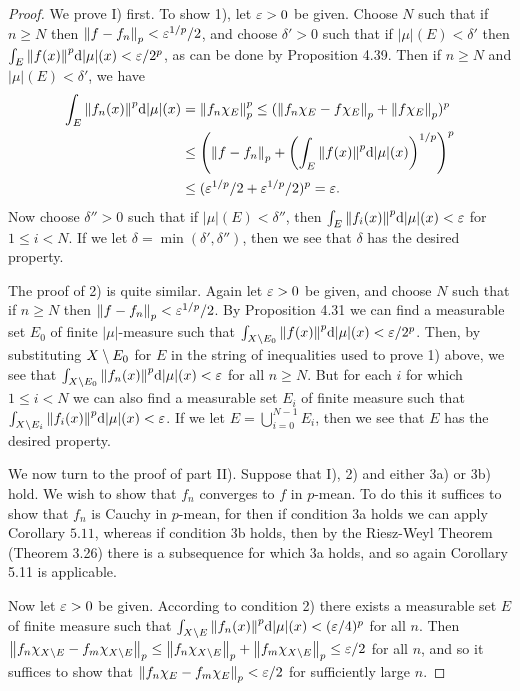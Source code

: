 \begin{proof}
We prove I) first. To show 1), let $\varepsilon>0$ be given. Choose $N$ such that if $n\geq N$ then $\norm{f-f_n}_p<\varepsilon^{1/p}/2$, and choose $\delta'>0$ such that if $|\mu|(E)<\delta'$ then $\int_E\norm{f(x)}^p\dd|\mu|(x)<\varepsilon/2^p$, as can be done by Proposition 4.39. Then if $n\geq N$ and $|\mu|(E)<\delta'$, we have 
\begin{align*}
\int_E\norm{f_n(x)}^p\dd|\mu|(x)&=\norm{f_n\chi_{E}}_p^p\leq(\norm{f_n\chi_{E}-f\chi_{E}}_p+\norm{f\chi_{E}}_p)^p\\
&\leq\left(\norm{f-f_n}_p+\left(\int_E\norm{f(x)}^p\dd|\mu|(x)\right)^{1/p}\right)^p\\
&\leq(\varepsilon^{1/p}/2+\varepsilon^{1/p}/2)^p=\varepsilon.
\end{align*}
Now choose $\delta''>0$ such that if $|\mu|(E)<\delta''$, then $\int_E\norm{f_i(x)}^p\dd|\mu|(x)<\varepsilon$ for $1\leq i<N$. If we let $\delta=\min(\delta',\delta'')$, then we see that $\delta$ has the desired property.

The proof of 2) is quite similar. Again let $\varepsilon>0$ be given, and choose $N$ such that if $n \geq N$ then $\norm{f-f_n}_p<\varepsilon^{1/p}/2$. By Proposition 4.31 we can find a measurable set $E_0$ of finite $|\mu|$-measure such that $\int_{X\setminus E_0}\norm{f(x)}^p\dd|\mu|(x)<\varepsilon/2^p$. Then, by substituting $X\setminus E_0$ for $E$ in the string of inequalities used to prove 1) above, we see that $\int_{X\setminus E_0}\norm{f_n(x)}^p\dd|\mu|(x)<\varepsilon$ for all $n\geq N$. But for each $i$ for which $1\leq i<N$ we can also find a measurable set $E_i$ of finite measure such that $\int_{X\setminus E_i}\norm{f_i(x)}^p\dd|\mu|(x)<\varepsilon$. If we let $E=\bigcup_{i=0}^{N-1}E_i$, then we see that $E$ has the desired property.

We now turn to the proof of part II). Suppose that I), 2) and either 3a) or 3b) hold. We wish to show that $f_n$ converges to $f$ in $p$-mean. To do this it suffices to show that $f_n$ is Cauchy in $p$-mean, for then if condition 3a holds we can apply Corollary $5.11$, whereas if condition 3b holds, then by the Riesz-Weyl Theorem (Theorem 3.26) there is a subsequence for which 3a holds, and so again Corollary 5.11 is applicable.

Now let $\varepsilon>0$ be given. According to condition 2) there exists a measurable set $E$ of finite measure such that $\int_{X\setminus E}\norm{f_n(x)}^p\dd|\mu|(x)<(\varepsilon/4)^p$ for all $n$. Then $\norm{f_n\chi_{X\setminus E}-f_m\chi_{X\setminus E}}_p\leq\norm{f_n\chi_{X\setminus E}}_p+\norm{f_m\chi_{X\setminus E}}_p\leq\varepsilon/2$ for all $n$, and so it suffices to show that $\norm{f_n\chi_{E}-f_m\chi_{E}}_p<\varepsilon/2$ for sufficiently large $n$.


\end{proof}
